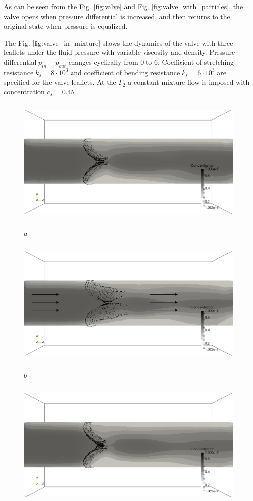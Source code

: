 \documentclass[runningheads,a4paper]{llncs}
\begin{document}
As can be seen from the Fig. \ref{fig:valve} and Fig. \ref{fig:valve_with_particles}, the valve opens when pressure differential is increased,
and then returns to the original state when pressure is equalized.

The Fig. \ref{fig:valve_in_mixture} shows the dynamics of the valve with three leaflets under the fluid pressure with variable viscosity and
density. Pressure differential $p_{in} - p_{out}$ changes cyclically from 0 to 6. Coefficient of stretching resistance $k_s = 8 \cdot 10^3$ and coefficient of
bending resistance $k_s = 6 \cdot 10^3$ are specified for the valve leaflets. At the $\Gamma_2$ a constant mixture flow is imposed with concentration $c_s = 0.45$.

\begin{figure}
\centering
\includegraphics[height=6.2cm]{images/valves_in_mixture_gray_scale_400.png}

$a$

\includegraphics[height=6.2cm]{images/valves_in_mixture_gray_scale_500.png}

$b$

\includegraphics[height=6.2cm]{images/valves_in_mixture_gray_scale_600.png}


\end{figure}
\end{document}
